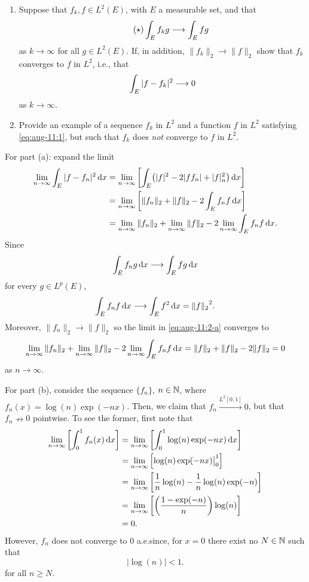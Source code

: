 \begin{problem}
  \hfill
  \begin{enumerate}[label=(\alph*)]
  \item Suppose that \(f_k,f\in L^2(E)\), with \(E\) a measurable set, and
    that
    \[
      \label{eq:aug-11:1}
      \tag{\(\star\)}
      \int_E f_kg\longrightarrow\int_E fg
    \]
    as \(k\to\infty\) for all \(g\in L^2(E)\). If, in addition,
    \(\|f_k\|_2\to\|f\|_2\) show that \(f_k\) converges to \(f\) in
    \(L^2\), i.e., that
    \[
      \int_E|f-f_k|^2\longrightarrow 0
    \]
    as \(k\to\infty\).
  \item Provide an example of a sequence \(f_k\) in \(L^2\) and a function
    \(f\) in \(L^2\) satisfying \eqref{eq:aug-11:1}, but such that \(f_k\)
    does \emph{not} converge to \(f\) in \(L^2\).
  \end{enumerate}
\end{problem}
\begin{solution}
  For part (a): expand the limit
  \begin{gather}
    \label{eq:aug-11:2-a}
    \begin{aligned}
      \lim_{n\to\infty}\int_E|f-f_n|^2\mathop{}\!\mathrm{d} x
      &=\lim_{n\to\infty}\left[\int_E\bigl(|f|^2-2|ff_n|+|f|_n^2\bigr)\mathop{}\!\mathrm{d} x\right]\\
      &=\lim_{n\to\infty}\left[\|f_n\|_2+\|f\|_2-2\int_E f_nf\mathop{}\!\mathrm{d} x\right]\\
      &=\lim_{n\to\infty}\|f_n\|_2+\lim_{n\to\infty}\|f\|_2-2\lim_{n\to\infty}\int_E
      f_nf\mathop{}\!\mathrm{d} x.
    \end{aligned}
  \end{gather}
  Since
  \[
    \int_Ef_ng\mathop{}\!\mathrm{d} x\longrightarrow \int_E fg\mathop{}\!\mathrm{d} x
  \]
  for every \(g\in L^p(E)\),
  \[
    \int_E f_nf\diff x\too \int_Ef^2\diff x={\|f\|_2}^{\cramped 2}.
  \]
  Moreover, \(\|f_n\|_2\to\|f\|_2\) so the limit in \eqref{eq:aug-11:2-a}
  converges to
  \[
    \lim_{n\to\infty}\|f_n\|_2+\lim_{n\to\infty}\|f\|_2-2\lim_{n\to\infty}\int_E
    f_nf\diff x
    =%
    \|f\|_2+\|f\|_2-2\|f\|_2=0
  \]
  as \(n\to\infty\).

  For part (b), consider the sequence \(\{f_n\}\), \(n\in\mathbb{N}\), where
  \(f_n(x)=\log(n)\exp(-nx)\). Then, we claim that
  \(f_n\xrightarrow{L^2[0,1]}0\), but that \(f_n\nrightarrow 0\)
  pointwise. To see the former, first note that
  \[
    \begin{aligned}
      \lim_{n\to\infty}\left[\int_0^1 f_n(x)\diff x\right]
      &=\lim_{n\to\infty}\left[\int_0^1\log(n)\exp(-nx)\diff x\right]\\
      &=\lim_{n\to\infty}\left[\log(n)\exp(-nx)\bigr|_0^1\right]\\
      &=\lim_{n\to\infty}\left[
      \frac{1}{n}\log(n)-\frac{1}{n}\log(n)\exp(-n)
      \right]\\
      &=\lim_{n\to\infty}\left[%
        \left(\frac{1-\exp(-n)}{n}\right)\log(n)%
      \right]\\
      &=0.
    \end{aligned}
  \]
  However, \(f_n\) does not converge to \(0\) a.e.\@ since, for
  \(x=0\) there exist no \(N\in\mathbb{N}\) such that
  \[
    |\log(n)|<1.
  \]
  for all \(n\geq N\).
\end{solution}

